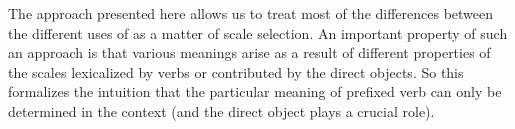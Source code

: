 


The approach presented here allows us to treat most of the differences between the different uses of  as a matter of scale selection. An important property of such an approach is that various meanings arise as a result of different properties of the scales lexicalized by verbs or contributed by the direct objects. So this formalizes the intuition that the particular meaning of prefixed verb can only be determined in the context (and the direct object plays a crucial role). 

